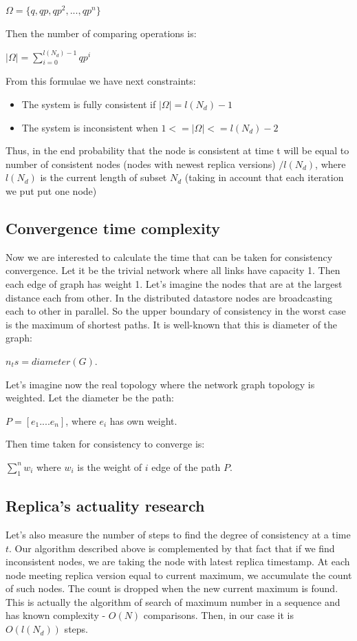 \documentclass{llncs}
\begin{document}
$\Omega = \{q, qp, qp^2, ..., qp^n\}$

Then the number of comparing operations is:

$\vert\Omega\vert = \sum_{i=0}^{l(N_d)-1}qp^i$

From this formulae we have next constraints:
\begin{itemize}
\item The system is fully consistent if $\vert\Omega\vert = l(N_d)-1$
\item The system is inconsistent when $1 <= \vert\Omega\vert <= l(N_d) -2$
\end{itemize}

Thus, in the end probability that the node is consistent at time t will be equal to number of consistent nodes (nodes with newest replica versions) $/ l(N_d)$, where $l(N_d)$ is the current length of subset $N_d$ (taking in account that each iteration we put put one node)

\subsection{Convergence time complexity}


Now we are interested to calculate the time that can be taken for consistency convergence.
Let it be the trivial network where all links have capacity 1. Then each edge of graph has weight 1.
Let's imagine the nodes that are at the largest distance each from other. In the distributed datastore nodes are
broadcasting each to other in parallel. So the upper boundary of consistency in the worst case is the maximum of
shortest paths. It is well-known that this is diameter of the graph:


$n_ts = diameter(G)$.


Let's imagine now the real topology where the network graph topology is weighted.
Let the diameter be the path:


$P = [e_1....e_n]$, where $e_i$ has own weight.


Then time taken for consistency to converge is:

$\sum_1^{n}w_i$ where $w_i$ is the weight of $i$ edge of the path $P$.


\subsection{Replica's actuality research}

Let's also measure the number of steps to find the degree of consistency at a time $t$.
Our algorithm described above is complemented by that fact that if we find inconsistent nodes,
we are taking the node with latest replica timestamp. At each node meeting replica version equal to current maximum, we accumulate the count of such nodes. The count is dropped when the new current maximum is found. This is actually the algorithm of search of maximum number in a sequence and has known complexity - $O(N)$ comparisons.
Then, in our case it is $O(l(N_d))$ steps.
\end{document}
